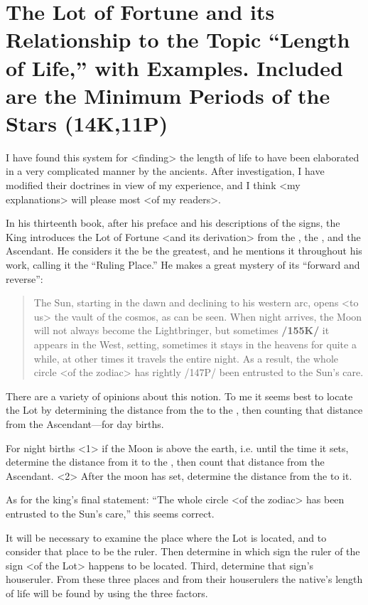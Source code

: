 \section{The Lot of Fortune and its Relationship to the Topic “Length of Life,” with Examples. Included are the Minimum Periods of the Stars (14K,11P)}

I have found this system for <finding> the length of life to have been elaborated in a very complicated manner by the ancients. After investigation, I have modified their doctrines in view of my experience, and I think <my explanations> will please most <of my readers>. 

In his thirteenth book, after his preface and his descriptions of the signs, the King introduces the Lot of Fortune <and its derivation> from the \Sun, the \Moon, and the Ascendant. He considers it the be the greatest, and he mentions it throughout his work, calling it the “Ruling Place.” He makes a great mystery of its “forward and reverse”: 
\begin{quote}
The Sun, starting in the dawn and declining to his western arc, opens <to us> the vault of the cosmos, as can be seen. When night arrives, the Moon will not always become the Lightbringer, but sometimes \textbf{/155K/} it appears in the West, setting, sometimes it stays in the heavens for quite a while, at other times it travels the entire night. As a result, the whole circle <of the zodiac> has rightly /147P/ been entrusted to the Sun’s care.
\end{quote}

There are a variety of opinions about this notion. To me it seems best to locate the Lot  by determining the distance from the \Sun\xspace to the \Moon, then counting that distance from the Ascendant—for day births. 

For night births <1> if the Moon is above the earth, i.e. until the time it sets, determine the distance from it to the \Sun, then count that distance from the Ascendant. <2> After the moon has set, determine the distance from the \Sun\xspace to it. 

As for the king’s final statement: “The whole circle <of the
zodiac> has been entrusted to the Sun’s care,” this seems correct. 

It will be necessary to examine the place where the Lot is located, and to consider that place to be the ruler. Then determine in which sign the ruler of the sign <of the Lot> happens to be located. Third, determine that sign’s houseruler. From these three places and from their houserulers the native’s length of life will be found by using the three factors.

